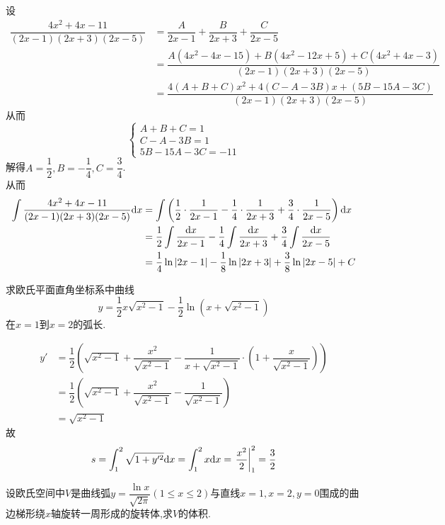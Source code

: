 \documentclass{ctexart}
\begin{document}
\begin{solution}
    设
    \begin{align*}
        \dfrac{4x^2+4x-11}{(2x-1)(2x+3)(2x-5)}
        &= \dfrac{A}{2x-1}+\dfrac{B}{2x+3}+\dfrac{C}{2x-5} \\
        &= \dfrac{A(4x^2-4x-15)+B(4x^2-12x+5)+C(4x^2+4x-3)}{(2x-1)(2x+3)(2x-5)} \\
        &= \dfrac{4(A+B+C)x^2+4(C-A-3B)x+(5B-15A-3C)}{(2x-1)(2x+3)(2x-5)}
    \end{align*}
    从而$$\left\{\begin{array}{l}
        A+B+C=1 \\
        C-A-3B=1 \\
        5B-15A-3C=-11
    \end{array}\right.$$
    解得$A=\dfrac{1}{2},B=-\dfrac{1}{4},C=\dfrac{3}{4}$.\\
    从而\begin{align*}
        \int{\dfrac{4x^2+4x-11}{(2x-1)(2x+3)(2x-5)}\mathrm{d}x}
        &= \int\left(\dfrac{1}{2}\cdot\dfrac{1}{2x-1}-\dfrac{1}{4}\cdot\dfrac{1}{2x+3}+\dfrac{3}{4}\cdot\dfrac{1}{2x-5}\right)\mathrm{d} x\\
        &= \dfrac{1}{2}\int{\dfrac{\mathrm{d}x}{2x-1}}-\dfrac{1}{4}\int{\dfrac{\mathrm{d}x}{2x+3}}+\dfrac{3}{4}\int{\dfrac{\mathrm{d}x}{2x-5}} \\
        &= \dfrac{1}{4}\ln{\left|2x-1\right|}-\dfrac{1}{8}\ln{\left|2x+3\right|}+\dfrac{3}{8}\ln{\left|2x-5\right|}+C
    \end{align*}
\end{solution}
\begin{problem}[5.(10\songti{分})]
    求欧氏平面直角坐标系中曲线$$y=\dfrac{1}{2}x\sqrt{x^2-1}-\dfrac{1}{2}\ln{\left(x+\sqrt{x^2-1}\right)}$$在$x=1$到$x=2$的弧长.
\end{problem}
\begin{solution}
    \begin{align*}
        y'
        &= \dfrac{1}{2}\left(\sqrt{x^2-1}+\dfrac{x^2}{\sqrt{x^2-1}}-\dfrac{1}{x+\sqrt{x^2-1}}\cdot\left(1+\dfrac{x}{\sqrt{x^2-1}}\right)\right) \\
        &= \dfrac{1}{2}\left(\sqrt{x^2-1}+\dfrac{x^2}{\sqrt{x^2-1}}-\dfrac{1}{\sqrt{x^2-1}}\right) \\
        &= \sqrt{x^2-1}
    \end{align*}
    故$$s=\int_{1}^{2}{\sqrt{1+y'^2}\mathrm{d} x}=\int_{1}^{2}{x\mathrm{d} x}=\left.\dfrac{x^2}{2}\right|_1^2=\dfrac{3}{2}$$
\end{solution}
\begin{problem}[6.(10\songti{分})]
    设欧氏空间中$V$是曲线弧$\displaystyle y=\dfrac{\ln{x}}{\sqrt{2\pi}}(1\leqslant x\leqslant 2)$与直线$x=1,x=2,y=0$围成的曲边梯形绕$x$轴旋转一周形成的旋转体,求$V$的体积.
\end{problem}
\end{document}
